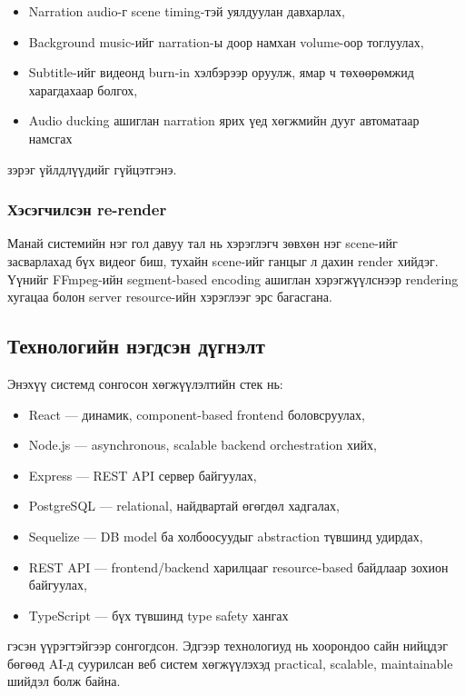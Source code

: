 \begin{itemize}
\item Narration audio-г scene timing-тэй уялдуулан давхарлах,
\item Background music-ийг narration-ы доор намхан volume-оор тоглуулах,
\item Subtitle-ийг видеонд burn-in хэлбэрээр оруулж, ямар ч төхөөрөмжид харагдахаар болгох,
\item Audio ducking ашиглан narration ярих үед хөгжмийн дууг автоматаар намсгах
\end{itemize}

зэрэг үйлдлүүдийг гүйцэтгэнэ.

\subsubsection{Хэсэгчилсэн re-render}

Манай системийн нэг гол давуу тал нь хэрэглэгч зөвхөн нэг scene-ийг засварлахад бүх видеог биш, тухайн scene-ийг ганцыг л дахин render хийдэг. Үүнийг FFmpeg-ийн segment-based encoding ашиглан хэрэгжүүлснээр rendering хугацаа болон server resource-ийн хэрэглээг эрс багасгана.
\subsection{Технологийн нэгдсэн дүгнэлт}

Энэхүү системд сонгосон хөгжүүлэлтийн стек нь:

\begin{itemize}
\item React --- динамик, component-based frontend боловсруулах,
\item Node.js --- asynchronous, scalable backend orchestration хийх,
\item Express --- REST API сервер байгуулах,
\item PostgreSQL --- relational, найдвартай өгөгдөл хадгалах,
\item Sequelize --- DB model ба холбоосуудыг abstraction түвшинд удирдах,
\item REST API --- frontend/backend харилцааг resource-based байдлаар зохион байгуулах,
\item TypeScript --- бүх түвшинд type safety хангах
\end{itemize}

гэсэн үүрэгтэйгээр сонгогдсон. Эдгээр технологиуд нь хоорондоо сайн нийцдэг бөгөөд AI-д суурилсан веб систем хөгжүүлэхэд practical, scalable, maintainable шийдэл болж байна.


